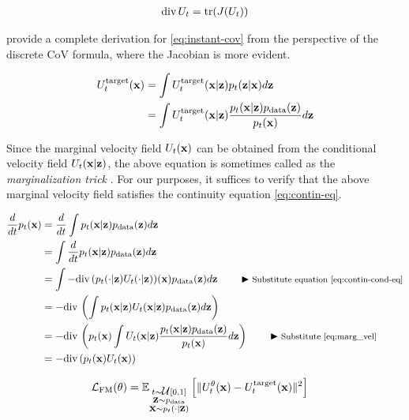 \documentclass[a4paper, 11pt]{article}
\begin{document}
\begin{align}
    \diver U_t = \tr(J(U_t))
\end{align} 

\cite{chen2018neural} provide a complete derivation for \eqref{eq:instant-cov} from the perspective of the discrete CoV formula, where the Jacobian is more evident.

\begin{align}
    U_t^{\text{target}}(\vx) &= \int U_t^{\text{target}}(\vx | \vz) p_t(\vz | \vx) d\vz \\
    &=  \int U_t^{\text{target}}(\vx | \vz) \frac{p_t( \vx|\vz)p_{\text{data}}(\vz)}{p_t(\vx)} d\vz \label{eq:marg_vel}
\end{align}

Since the marginal velocity field $U_t(\vx)$ can be obtained from the conditional velocity field $U_t(\vx | \vz)$, the above equation is sometimes called as the \textit{marginalization trick} \citep{flowsanddiffusions2025}. For our purposes, it suffices to verify that the above marginal velocity field satisfies the continuity equation \eqref{eq:contin-eq}.

\begin{align}
    \frac{d}{dt} p_t(\vx) &= \frac{d}{dt} \int p_t(\vx | \vz) p_{\text{data}}(\vz) d\vz \\
    &= \int \frac{d}{dt} p_t(\vx | \vz) p_{\text{data}}(\vz) d\vz \\
    &= \int - \diver (p_t(\cdot |\vz) U_t(\cdot |\vz))(\vx)  p_{\text{data}}(\vz) d\vz \eqcomment{Substitute equation \eqref{eq:contin-cond-eq}}\\
    &= - \diver \left ( \int p_t(\vx |\vz)U_t(\vx |\vz)  p_{\text{data}}(\vz) d\vz \right ) \\
    &= - \diver \left ( p_t(\vx) \int U_t(\vx |\vz) \frac{p_t(\vx |\vz)  p_{\text{data}}(\vz)}{p_t(\vx)} d\vz \right ) \eqcomment{Substitute \eqref{eq:marg_vel}}\\
    &= - \diver( p_t(\vx)U_t(\vx))
\end{align}



\begin{align}
    \fL_{\text{FM}}(\theta) &= \E_{\substack{t \sim \fU[0, 1] \\ 
    \vz \sim p_{\text{data}} \\
    \vx \sim p_t(\cdot | \vz)}} \left [ \|U_t^{\theta}(\vx) - U_t^{\text{target}}(\vx) \|^2 \right ] \label{eq:fm_loss}
\end{align}
\end{document}
